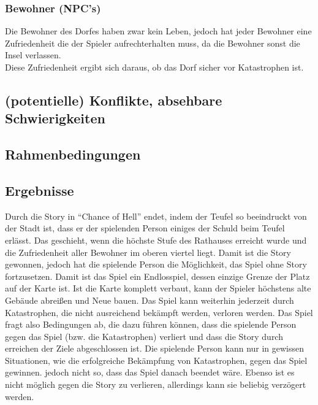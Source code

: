 \documentclass[paper=A4,pagesize=auto,12pt,headinclude=true,footinclude=true,BCOR=0mm,DIV=calc]{scrartcl}
\newcommand{\sectionspace}{
	\vspace{0.5cm}
}
\newcommand{\gametitle}{Chance of Hell}
\begin{document}
\subsubsection{Bewohner (NPC's)}
Die Bewohner des Dorfes haben zwar kein Leben, jedoch hat jeder Bewohner eine Zufriedenheit die der Spieler aufrechterhalten muss, da die Bewohner sonst die Insel verlassen.\\
Diese Zufriedenheit ergibt sich daraus, ob das Dorf sicher vor Katastrophen ist.

\sectionspace
\subsection{(potentielle) Konflikte, absehbare Schwierigkeiten}\label{sec:Konflikte}

\sectionspace
\subsection{Rahmenbedingungen}\label{sec:Rahmenbedingungen}

\sectionspace
\subsection{Ergebnisse}\label{sec:Ergebnisse}
Durch die Story in ``\gametitle'' endet, indem der Teufel so beeindruckt von der Stadt ist, dass er der spielenden Person einiges der Schuld beim Teufel erlässt. Das geschieht, wenn die höchste Stufe des Rathauses erreicht wurde und die Zufriedenheit aller Bewohner im oberen viertel liegt. Damit ist die Story gewonnen, jedoch hat die spielende Person die Möglichkeit, das Spiel ohne Story fortzusetzen. Damit ist das Spiel ein Endlosspiel, dessen einzige Grenze der Platz auf der Karte ist. Ist die Karte komplett verbaut, kann der Spieler höchstens alte Gebäude abreißen und Neue bauen. Das Spiel kann weiterhin jederzeit durch Katastrophen, die nicht ausreichend bekämpft werden, verloren werden.
Das Spiel fragt also Bedingungen ab, die dazu führen können, dass die spielende Person gegen das Spiel (bzw. die Katastrophen) verliert und dass die Story durch erreichen der Ziele abgeschlossen ist. Die spielende Person kann nur in gewissen Situationen, wie die erfolgreiche Bekämpfung von Katastrophen, gegen das Spiel gewinnen. jedoch nicht so, dass das Spiel danach beendet wäre. Ebenso ist es nicht möglich gegen die Story zu verlieren, allerdings kann sie beliebig verzögert werden.


\sectionspace
\printbibliography[heading=bibnumbered, title=Referenzen]\label{sec:Referenzen}
\end{document}
